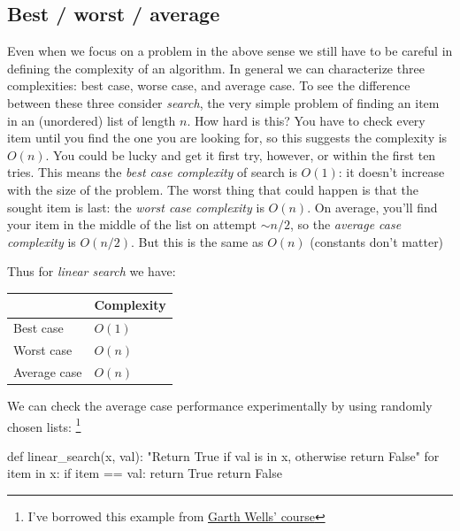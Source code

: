 \documentclass[
  letterpaper,
  DIV=11,
  numbers=noendperiod]{scrreprt}
\newenvironment{Shaded}{\begin{snugshade}}{\end{snugshade}}
\newcommand{\CommentTok}[1]{\textcolor[rgb]{0.37,0.37,0.37}{#1}}
\newcommand{\ControlFlowTok}[1]{\textcolor[rgb]{0.00,0.23,0.31}{#1}}
\newcommand{\KeywordTok}[1]{\textcolor[rgb]{0.00,0.23,0.31}{#1}}
\newcommand{\NormalTok}[1]{\textcolor[rgb]{0.00,0.23,0.31}{#1}}
\newcommand{\OperatorTok}[1]{\textcolor[rgb]{0.37,0.37,0.37}{#1}}
\newcommand{\VariableTok}[1]{\textcolor[rgb]{0.07,0.07,0.07}{#1}}
\theoremstyle{definition}
\theoremstyle{remark}
\begin{document}
\hypertarget{best-worst-average}{%
\subsection{Best / worst / average}\label{best-worst-average}}

Even when we focus on a problem in the above sense we still have to be
careful in defining the complexity of an algorithm. In general we can
characterize three complexities: best case, worse case, and average
case. To see the difference between these three consider \emph{search},
the very simple problem of finding an item in an (unordered) list of
length \(n\). How hard is this? You have to check every item until you
find the one you are looking for, so this suggests the complexity is
\(O(n)\). You could be lucky and get it first try, however, or within
the first ten tries. This means the \emph{best case complexity} of
search is \(O(1)\): it doesn't increase with the size of the problem.
The worst thing that could happen is that the sought item is last: the
\emph{worst case complexity} is \(O(n)\). On average, you'll find your
item in the middle of the list on attempt \(\sim n/2\), so the
\emph{average case complexity} is \(O(n/2)\). But this is the same as
\(O(n)\) (constants don't matter)

Thus for \emph{linear search} we have:

\begin{longtable}[]{@{}ll@{}}
\toprule()
& Complexity \\
\midrule()
\endhead
Best case & \(O(1)\) \\
Worst case & \(O(n)\) \\
Average case & \(O(n)\) \\
\bottomrule()
\end{longtable}

We can check the average case performance experimentally by using
randomly chosen lists: \footnote{I've borrowed this example from
  \href{https://github.com/CambridgeEngineering/PartIA-Computing-Michaelmas/blob/main/11\%20Complexity.ipynb}{Garth
  Wells' course}}

\begin{Shaded}
\begin{Highlighting}[]
\KeywordTok{def}\NormalTok{ linear\_search(x, val):}
    \CommentTok{"Return True if val is in x, otherwise return False"}
    \ControlFlowTok{for}\NormalTok{ item }\KeywordTok{in}\NormalTok{ x:}
        \ControlFlowTok{if}\NormalTok{ item }\OperatorTok{==}\NormalTok{ val:}
            \ControlFlowTok{return} \VariableTok{True}
    \ControlFlowTok{return} \VariableTok{False}
\end{Highlighting}
\end{Shaded}
\end{document}
